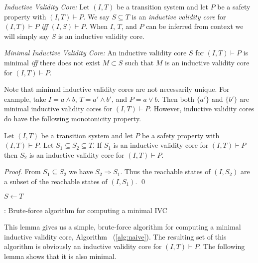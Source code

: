 \begin{definition}{\emph{Inductive Validity Core:}}
  \label{def:ivc}
  Let $(I, T)$ be a transition system and let $P$ be a
  safety property with $(I, T)\vdash P$. We say $S \subseteq
  T$ is an {\em inductive validity core} for $(I, T)\vdash P$ \emph{iff} $(I,
  S) \vdash P$. When $I$, $T$, and $P$ can be inferred from
  context we will simply say $S$ is an inductive validity core.
\end{definition}

\begin{definition}{\emph{Minimal Inductive Validity Core:}}
  \label{def:minimal-ivc}
  An inductive validity core $S$ for $(I, T)\vdash P$ is minimal \emph{iff}
  there does not exist $M \subset S$ such that $M$ is an inductive validity core
  for $(I, T)\vdash P$.
\end{definition}

Note that minimal inductive validity cores are not necessarily unique.
For example, take $I = a \land b$, $T = a' \land b'$, and $P = a \lor
b$. Then both $\{a'\}$ and $\{b'\}$ are minimal inductive validity
cores for $(I, T)\vdash P$. However, inductive validity cores do have
the following monotonicity property.

\begin{lemma}
  \label{lem:ivc-monotonic}
  Let $(I, T)$ be a transition system and let $P$ be a safety property
  with $(I, T)\vdash P$. Let $S_1 \subseteq S_2 \subseteq T$. If $S_1$
  is an inductive validity core for $(I, T)\vdash P$ then $S_2$ is an
  inductive validity core for $(I, T)\vdash P$.
\end{lemma}
\begin{proof}
  From $S_1 \subseteq S_2$ we have $S_2 \Rightarrow S_1$. Thus the
  reachable states of $(I, S_2)$ are a subset of the reachable states
  of $(I, S_1)$. \qed
\end{proof}

\begin{algorithm}[t]
  \BlankLine
  $S \leftarrow T$ \\
   {
  }
\caption{\bfalg: Brute-force algorithm for computing a minimal IVC}
\label{alg:naive}
\end{algorithm}

This lemma gives us a simple, brute-force algorithm for computing
a minimal inductive validity core, Algorithm \bfalg~(\ref{alg:naive}). The
resulting set of this algorithm is obviously an inductive validity
core for $(I, T)\vdash P$. The following lemma shows that it is also
minimal.

